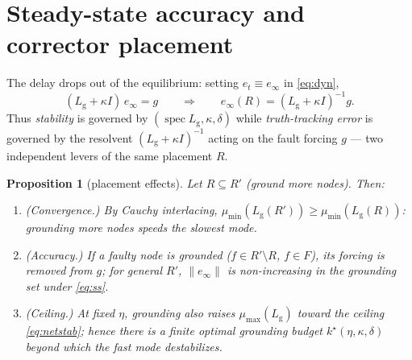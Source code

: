 \documentclass[11pt]{article}
\newtheorem{proposition}{Proposition}
\theoremstyle{definition}
\newcommand{\Lg}{L_{\mathrm g}}
\newcommand{\spec}{\operatorname{spec}}
\begin{document}
\section{Steady-state accuracy and corrector placement}

The delay drops out of the equilibrium: setting $e_{t}\equiv e_\infty$ in \eqref{eq:dyn},
\begin{equation}\label{eq:ss}
  (\Lg+\kappa I)\,e_\infty = g
  \qquad\Longrightarrow\qquad
  e_\infty(R) = (\Lg+\kappa I)^{-1} g .
\end{equation}
Thus \emph{stability} is governed by $(\spec\Lg,\kappa,\delta)$ while \emph{truth-tracking
error} is governed by the resolvent $(\Lg+\kappa I)^{-1}$ acting on the fault forcing $g$ ---
two independent levers of the same placement $R$.

\begin{proposition}[placement effects]\label{prop:place}
Let $R\subseteq R'$ (ground more nodes). Then:
\begin{enumerate}
  \item \emph{(Convergence.)} By Cauchy interlacing, $\mu_{\min}(L_{\mathrm g}(R'))\ge
        \mu_{\min}(L_{\mathrm g}(R))$: grounding more nodes speeds the slowest mode.
  \item \emph{(Accuracy.)} If a faulty node is grounded ($f\in R'\setminus R$, $f\in F$), its
        forcing is removed from $g$; for general $R'$, $\|e_\infty\|$ is non-increasing in the
        grounding set under \eqref{eq:ss}.
  \item \emph{(Ceiling.)} At fixed $\eta$, grounding also raises $\mu_{\max}(\Lg)$ toward the
        ceiling \eqref{eq:netstab}; hence there is a \emph{finite} optimal grounding budget
        $k^\star(\eta,\kappa,\delta)$ beyond which the fast mode destabilizes.
\end{enumerate}
\end{proposition}
\end{document}
